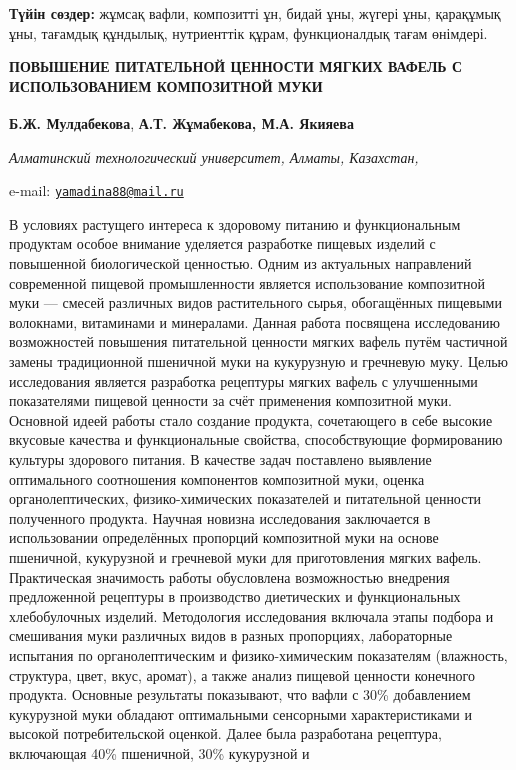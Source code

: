 {\bfseries Түйін сөздер:} жұмсақ вафли, композитті ұн, бидай ұны, жүгері
ұны, қарақұмық ұны, тағамдық құндылық, нутриенттік құрам, функционалдық
тағам өнімдері.

{\bfseries ПОВЫШЕНИЕ ПИТАТЕЛЬНОЙ ЦЕННОСТИ МЯГКИХ ВАФЕЛЬ С ИСПОЛЬЗОВАНИЕМ
КОМПОЗИТНОЙ МУКИ}

{\bfseries Б.Ж. Мулдабекова}, {\bfseries А.Т. Жұмабекова, М.А.
Якияева\textsuperscript{\envelope }}

\emph{Алматинский технологический университет, Алматы, Казахстан,}

e-mail: \href{mailto:yamadina88@mail.ru}{\nolinkurl{yamadina88@mail.ru}}

В условиях растущего интереса к здоровому питанию и функциональным
продуктам особое внимание уделяется разработке пищевых изделий с
повышенной биологической ценностью. Одним из актуальных направлений
современной пищевой промышленности является использование композитной
муки --- смесей различных видов растительного сырья, обогащённых
пищевыми волокнами, витаминами и минералами. Данная работа посвящена
исследованию возможностей повышения питательной ценности мягких вафель
путём частичной замены традиционной пшеничной муки на кукурузную и
гречневую муку. Целью исследования является разработка рецептуры мягких
вафель с улучшенными показателями пищевой ценности за счёт применения
композитной муки. Основной идеей работы стало создание продукта,
сочетающего в себе высокие вкусовые качества и функциональные свойства,
способствующие формированию культуры здорового питания. В качестве задач
поставлено выявление оптимального соотношения компонентов композитной
муки, оценка органолептических, физико-химических показателей и
питательной ценности полученного продукта. Научная новизна исследования
заключается в использовании определённых пропорций композитной муки на
основе пшеничной, кукурузной и гречневой муки для приготовления мягких
вафель. Практическая значимость работы обусловлена возможностью
внедрения предложенной рецептуры в производство диетических и
функциональных хлебобулочных изделий. Методология исследования включала
этапы подбора и смешивания муки различных видов в разных пропорциях,
лабораторные испытания по органолептическим и физико-химическим
показателям (влажность, структура, цвет, вкус, аромат), а также анализ
пищевой ценности конечного продукта. Основные результаты показывают, что
вафли с 30\% добавлением кукурузной муки обладают оптимальными
сенсорными характеристиками и высокой потребительской оценкой. Далее
была разработана рецептура, включающая 40\% пшеничной, 30\% кукурузной и
